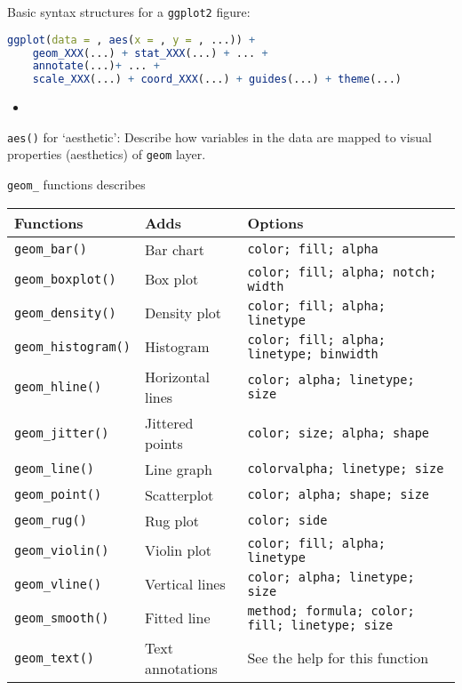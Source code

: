     Basic syntax structures for a \lstinline|ggplot2| figure:
\begin{lstlisting}[language=R]
ggplot(data = , aes(x = , y = , ...)) +
    geom_XXX(...) + stat_XXX(...) + ... +
    annotate(...)+ ... +
    scale_XXX(...) + coord_XXX(...) + guides(...) + theme(...)    
\end{lstlisting}


\begin{itemize}[topsep=6pt,itemsep=4pt]
    \item 
\end{itemize}

    
\begin{point}
    \lstinline|aes()| for `aesthetic': Describe how variables in the data are mapped to visual properties (aesthetics) of \lstinline|geom| layer.
\end{point}



    \lstinline|geom_| functions describes
\begin{table}[H]
    \centering
      \begin{tabular}{l|l|l}
        \hline
      Functions  & Adds  & Options \\
      \hline
      \lstinline|geom_bar()|  & Bar chart  & \lstinline|color; fill; alpha | \\
      \lstinline|geom_boxplot()|  & Box plot  & \lstinline|color; fill; alpha; notch; width | \\
      \lstinline|geom_density()|  & Density plot  & \lstinline|color; fill; alpha; linetype | \\
      \lstinline|geom_histogram()|  & Histogram  & \lstinline|color; fill; alpha; linetype; binwidth | \\
      \lstinline|geom_hline()|  & Horizontal lines  & \lstinline|color; alpha; linetype; size | \\
      \lstinline|geom_jitter()|  & Jittered points  & \lstinline|color; size; alpha; shape | \\
      \lstinline|geom_line()|  & Line graph  & \lstinline|colorvalpha; linetype; size | \\
      \lstinline|geom_point()|  & Scatterplot  & \lstinline|color; alpha; shape; size | \\
      \lstinline|geom_rug()|  & Rug plot  & \lstinline|color; side | \\
      \lstinline|geom_violin()|  & Violin plot  & \lstinline|color; fill; alpha; linetype | \\
      \lstinline|geom_vline()|  & Vertical lines  & \lstinline|color; alpha; linetype; size | \\
      \hline
      \lstinline|geom_smooth()|  & Fitted line  & \lstinline|method; formula; color; fill; linetype; size | \\
      \lstinline|geom_text()|  & Text annotations & See the help for this function \\
      \hline
      \end{tabular}
  \end{table}
  
